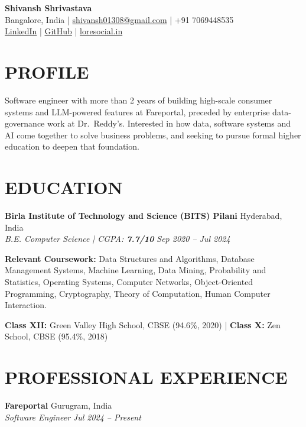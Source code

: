 \documentclass[a4paper,10pt]{extarticle}
\newcommand{\resumeSubheading}[4]{%
    \textbf{#1} \hfill #2\\
    \textit{#3} \hfill \textit{#4}}
\begin{document}
\begin{center}
    {\Large \textbf{Shivansh Shrivastava}}\\[4pt]
    Bangalore, India \quad | \quad
    \href{mailto:shivansh01308@gmail.com}{shivansh01308@gmail.com}
    \quad | \quad +91 7069448535\\[2pt]
    \href{https://www.linkedin.com/in/shivansh-shrivastava-716013205}{LinkedIn}
    \quad | \quad
    \href{https://github.com/shivansh-13}{GitHub}
    \quad | \quad
    \href{https://loresocial.in}{loresocial.in}
\end{center}

\section*{PROFILE}

Software engineer with more than 2 years of building high-scale consumer systems and LLM-powered features at
Fareportal, preceded by enterprise data-governance work at Dr.\ Reddy's. Interested in how data,
software systems and AI come together to solve business problems, and seeking to pursue formal higher education to deepen that foundation.

\section*{EDUCATION}

\resumeSubheading
{Birla Institute of Technology and Science (BITS) Pilani}
{Hyderabad, India}
{B.E. Computer Science \quad | \quad CGPA: \textbf{7.7/10}}
{Sep 2020 -- Jul 2024}

\textbf{Relevant Coursework:} Data Structures and Algorithms, Database Management Systems, Machine
Learning, Data Mining, Probability and Statistics, Operating Systems, Computer Networks,
Object-Oriented Programming, Cryptography, Theory of Computation, Human Computer Interaction.

\vspace{2pt}
\textbf{Class XII:} Green Valley High School, CBSE (94.6\%, 2020) \quad | \quad
\textbf{Class X:} Zen School, CBSE (95.4\%, 2018)

\section*{PROFESSIONAL EXPERIENCE}

\resumeSubheading
{Fareportal}
{Gurugram, India}
{Software Engineer}
{Jul 2024 -- Present}
\end{document}
